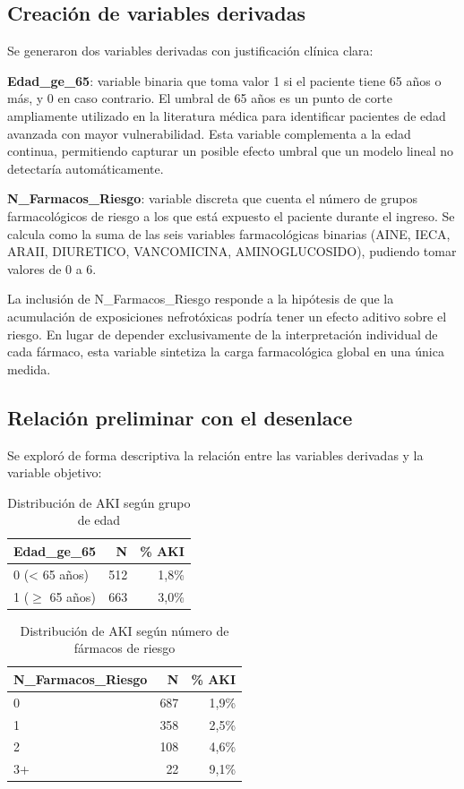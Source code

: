 \documentclass[12pt, a4paper, oneside]{report}
\begin{document}
\subsection{Creación de variables derivadas}

Se generaron dos variables derivadas con justificación clínica clara:

\textbf{Edad\_ge\_65}: variable binaria que toma valor 1 si el paciente tiene 65 años o más, y 0 en caso contrario. El umbral de 65 años es un punto de corte ampliamente utilizado en la literatura médica para identificar pacientes de edad avanzada con mayor vulnerabilidad. Esta variable complementa a la edad continua, permitiendo capturar un posible efecto umbral que un modelo lineal no detectaría automáticamente.

\textbf{N\_Farmacos\_Riesgo}: variable discreta que cuenta el número de grupos farmacológicos de riesgo a los que está expuesto el paciente durante el ingreso. Se calcula como la suma de las seis variables farmacológicas binarias (AINE, IECA, ARAII, DIURETICO, VANCOMICINA, AMINOGLUCOSIDO), pudiendo tomar valores de 0 a 6.

La inclusión de N\_Farmacos\_Riesgo responde a la hipótesis de que la acumulación de exposiciones nefrotóxicas podría tener un efecto aditivo sobre el riesgo. En lugar de depender exclusivamente de la interpretación individual de cada fármaco, esta variable sintetiza la carga farmacológica global en una única medida.

\subsection{Relación preliminar con el desenlace}

Se exploró de forma descriptiva la relación entre las variables derivadas y la variable objetivo:

\begin{table}[h]
\centering
\begin{tabular}{lrr}
\hline
\textbf{Edad\_ge\_65} & \textbf{N} & \textbf{\% AKI} \\
\hline
0 (< 65 años) & 512 & 1,8\% \\
1 ($\geq$ 65 años) & 663 & 3,0\% \\
\hline
\end{tabular}
\caption{Distribución de AKI según grupo de edad}
\label{tab:edad_aki}
\end{table}

\begin{table}[h]
\centering
\begin{tabular}{lrr}
\hline
\textbf{N\_Farmacos\_Riesgo} & \textbf{N} & \textbf{\% AKI} \\
\hline
0 & 687 & 1,9\% \\
1 & 358 & 2,5\% \\
2 & 108 & 4,6\% \\
3+ & 22 & 9,1\% \\
\hline
\end{tabular}
\caption{Distribución de AKI según número de fármacos de riesgo}
\label{tab:nfarmacos_aki}
\end{table}
\end{document}
